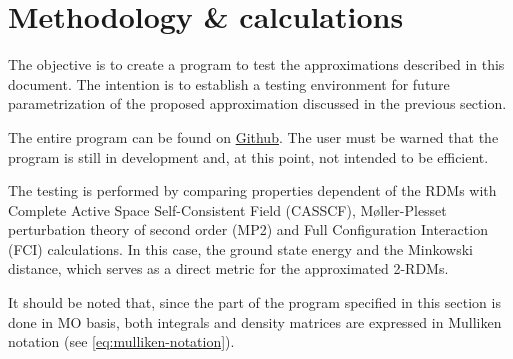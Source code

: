 \section{Methodology \& calculations} %
\label{sec:methodology-calculations}
The objective is to create a program to test the approximations described in
this document.
The intention is to establish a testing environment for future parametrization 
of the proposed approximation discussed in the previous section.

The entire program can be found on 
\href{https://github.com/jaqg/density-matrix}{Github}.
The user must be warned that the program is still in development and, at this
point, not intended to be efficient.

The testing is performed by comparing properties dependent of the
RDMs with Complete Active Space Self-Consistent Field (CASSCF),
Møller-Plesset perturbation theory of second order (MP2) and
Full Configuration Interaction (FCI) calculations.
In this case, the ground state energy and the Minkowski distance, which serves
as a direct metric for the approximated 2-RDMs.

It should be noted that, since the part of the program specified in this section
is done in MO basis, both integrals and density matrices are expressed in
Mulliken notation (see \cref{eq:mulliken-notation}).
